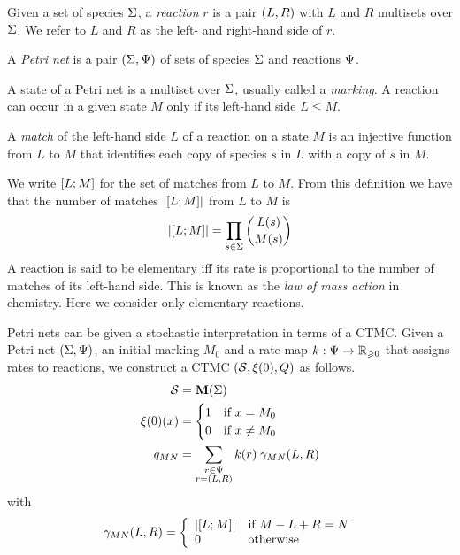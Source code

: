 \begin{definition}
  Given a set of species $\Sigma$,
  a \emph{reaction} $r$ is a pair $\left(L,R\right)$
  with $L$ and $R$ multisets over $\Sigma$.
  We refer to $L$ and $R$ as the left- and right-hand side of $r$.
\end{definition}

\begin{definition}%
  A \emph{Petri net} is a pair $\left(\Sigma, \Psi\right)$ of
  sets of species $\Sigma$ and reactions $\Psi$.
\end{definition}

A state of a Petri net is a multiset over $\Sigma$,
usually called a \emph{marking}.
A reaction can occur in a given state $M$ only if
its left-hand side $L \leqslant M$.

\begin{definition}
  A \emph{match} of the left-hand side $L$ of a reaction
  on a state $M$ is an injective function from $L$ to $M$
  that identifies each copy of species $s$ in $L$
  with a copy of $s$ in $M$.
\end{definition}

We write $\left[L;M\right]$ for the set of matches from $L$ to $M$.
From this definition we have that the number of matches
$\left\lvert \left[L;M\right] \right\rvert$ from $L$ to $M$ is
\[ \left\lvert \left[L;M\right] \right\rvert = \prod_{s \in \Sigma} \binom{L(s)}{M(s)} \]
A reaction is said to be elementary iff its rate is
proportional to the number of matches of its left-hand side.
This is known as the \emph{law of mass action} in chemistry.
Here we consider only elementary reactions.

Petri nets can be given a stochastic interpretation
in terms of a CTMC.
Given a Petri net $\left(\Sigma, \Psi\right)$,
an initial marking $M_0$ and
a rate map $k: \Psi \to \mathbb{R}_{\geqslant 0}$
that assigns rates to reactions,
we construct a CTMC $\left(\mathcal{S}, \xi(0), Q\right)$ as follows.
\begin{align*}
  \mathcal{S} &= \mathbf{M}(\Sigma) \\
  \xi(0)(x) &= \begin{cases}
    1 \quad\text{if } x = M_0 \\
    0 \quad\text{if } x \neq M_0
  \end{cases} \\
  q_{MN} &= \sum_{\substack{r \in \Psi\\r = \left(L,R\right)}}
    k(r) \; \gamma_{MN}(L,R)
\end{align*}
with
\begin{equation*}
  \gamma_{MN}(L,R) = \left\{\begin{array}{ll}
    \left\lvert \left[L;M\right] \right\rvert & \text{if } M - L + R = N \\
    0 & \text{otherwise}
  \end{array}\right.
\end{equation*}

